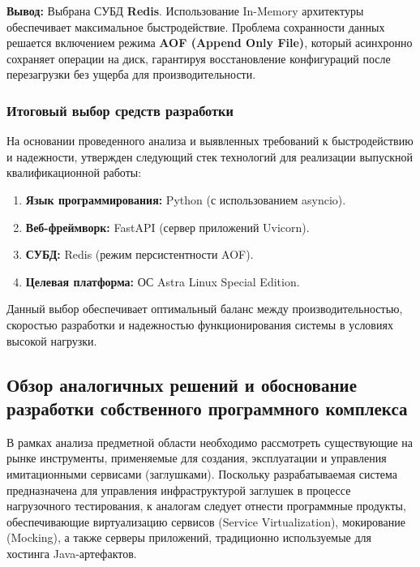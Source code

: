 \documentclass[
]{article}
\begin{document}
\textbf{Вывод:} Выбрана СУБД \textbf{Redis}. Использование In-Memory
архитектуры обеспечивает максимальное быстродействие. Проблема
сохранности данных решается включением режима \textbf{AOF (Append Only
File)}, который асинхронно сохраняет операции на диск, гарантируя
восстановление конфигураций после перезагрузки без ущерба для
производительности.

\subsubsection{Итоговый выбор средств
разработки}\label{ux438ux442ux43eux433ux43eux432ux44bux439-ux432ux44bux431ux43eux440-ux441ux440ux435ux434ux441ux442ux432-ux440ux430ux437ux440ux430ux431ux43eux442ux43aux438}

На основании проведенного анализа и выявленных требований к
быстродействию и надежности, утвержден следующий стек технологий для
реализации выпускной квалификационной работы:

\begin{enumerate}
\def\labelenumi{\arabic{enumi}.}
\item
  \textbf{Язык программирования:} Python (с использованием asyncio).
\item
  \textbf{Веб-фреймворк:} FastAPI (сервер приложений Uvicorn).
\item
  \textbf{СУБД:} Redis (режим персистентности AOF).
\item
  \textbf{Целевая платформа:} ОС Astra Linux Special Edition.
\end{enumerate}

Данный выбор обеспечивает оптимальный баланс между производительностью,
скоростью разработки и надежностью функционирования системы в условиях
высокой нагрузки.

\subsection{Обзор аналогичных решений и обоснование разработки
собственного программного
комплекса}\label{ux43eux431ux437ux43eux440-ux430ux43dux430ux43bux43eux433ux438ux447ux43dux44bux445-ux440ux435ux448ux435ux43dux438ux439-ux438-ux43eux431ux43eux441ux43dux43eux432ux430ux43dux438ux435-ux440ux430ux437ux440ux430ux431ux43eux442ux43aux438-ux441ux43eux431ux441ux442ux432ux435ux43dux43dux43eux433ux43e-ux43fux440ux43eux433ux440ux430ux43cux43cux43dux43eux433ux43e-ux43aux43eux43cux43fux43bux435ux43aux441ux430}

В рамках анализа предметной области необходимо рассмотреть существующие
на рынке инструменты, применяемые для создания, эксплуатации и
управления имитационными сервисами (заглушками). Поскольку
разрабатываемая система предназначена для управления инфраструктурой
заглушек в процессе нагрузочного тестирования, к аналогам следует
отнести программные продукты, обеспечивающие виртуализацию сервисов
(Service Virtualization), мокирование (Mocking), а также серверы
приложений, традиционно используемые для хостинга Java-артефактов.
\end{document}
